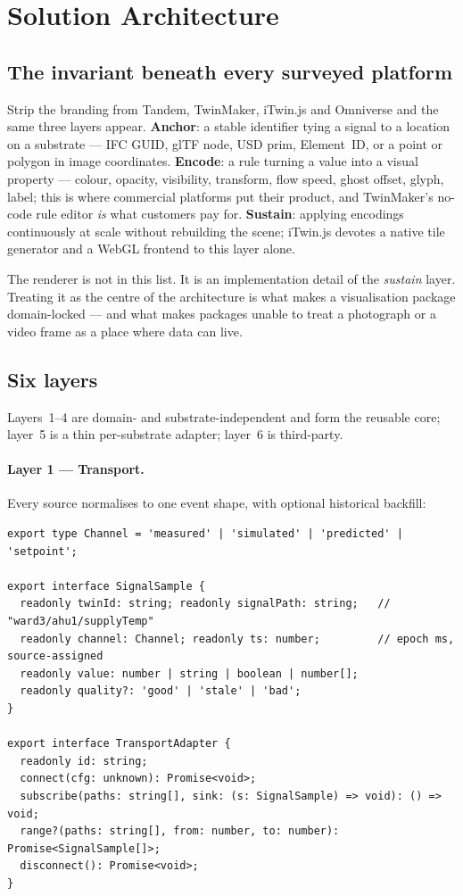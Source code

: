 \section{Solution Architecture}
\label{sec:architecture}

\subsection{The invariant beneath every surveyed platform}

Strip the branding from Tandem, TwinMaker, iTwin.js and Omniverse and the same three
layers appear. \textbf{Anchor}: a stable identifier tying a signal to a location on a
substrate --- IFC GUID, glTF node, USD prim, Element~ID, or a point or polygon in image
coordinates. \textbf{Encode}: a rule turning a value into a visual property --- colour,
opacity, visibility, transform, flow speed, ghost offset, glyph, label; this is where
commercial platforms put their product, and TwinMaker's no-code rule editor \emph{is}
what customers pay for. \textbf{Sustain}: applying encodings continuously at scale
without rebuilding the scene; iTwin.js devotes a native tile generator and a WebGL
frontend to this layer alone.

\begin{keypoint}
The renderer is not in this list. It is an implementation detail of the \emph{sustain}
layer. Treating it as the centre of the architecture is what makes a visualisation
package domain-locked --- and what makes packages unable to treat a photograph or a
video frame as a place where data can live.
\end{keypoint}

\subsection{Six layers}

Layers~1--4 are domain- and substrate-independent and form the reusable core; layer~5 is
a thin per-substrate adapter; layer~6 is third-party.

\paragraph{Layer 1 --- Transport.} Every source normalises to one event shape, with
optional historical backfill:

\begin{lstlisting}
export type Channel = 'measured' | 'simulated' | 'predicted' | 'setpoint';

export interface SignalSample {
  readonly twinId: string; readonly signalPath: string;   // "ward3/ahu1/supplyTemp"
  readonly channel: Channel; readonly ts: number;         // epoch ms, source-assigned
  readonly value: number | string | boolean | number[];
  readonly quality?: 'good' | 'stale' | 'bad';
}

export interface TransportAdapter {
  readonly id: string;
  connect(cfg: unknown): Promise<void>;
  subscribe(paths: string[], sink: (s: SignalSample) => void): () => void;
  range?(paths: string[], from: number, to: number): Promise<SignalSample[]>;
  disconnect(): Promise<void>;
}
\end{lstlisting}

